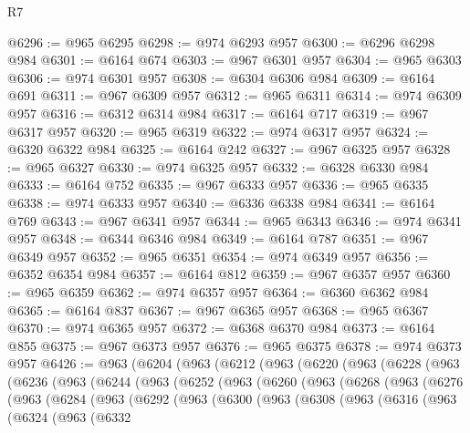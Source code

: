 \begin{lexlean}{R7}
\begin{coremodule}
@6296 := @965 @6295
@6298 := @974 @6293 @957
@6300 := @6296 @6298 @984
@6301 := @6164 @674
@6303 := @967 @6301 @957
@6304 := @965 @6303
@6306 := @974 @6301 @957
@6308 := @6304 @6306 @984
@6309 := @6164 @691
@6311 := @967 @6309 @957
@6312 := @965 @6311
@6314 := @974 @6309 @957
@6316 := @6312 @6314 @984
@6317 := @6164 @717
@6319 := @967 @6317 @957
@6320 := @965 @6319
@6322 := @974 @6317 @957
@6324 := @6320 @6322 @984
@6325 := @6164 @242
@6327 := @967 @6325 @957
@6328 := @965 @6327
@6330 := @974 @6325 @957
@6332 := @6328 @6330 @984
@6333 := @6164 @752
@6335 := @967 @6333 @957
@6336 := @965 @6335
@6338 := @974 @6333 @957
@6340 := @6336 @6338 @984
@6341 := @6164 @769
@6343 := @967 @6341 @957
@6344 := @965 @6343
@6346 := @974 @6341 @957
@6348 := @6344 @6346 @984
@6349 := @6164 @787
@6351 := @967 @6349 @957
@6352 := @965 @6351
@6354 := @974 @6349 @957
@6356 := @6352 @6354 @984
@6357 := @6164 @812
@6359 := @967 @6357 @957
@6360 := @965 @6359
@6362 := @974 @6357 @957
@6364 := @6360 @6362 @984
@6365 := @6164 @837
@6367 := @967 @6365 @957
@6368 := @965 @6367
@6370 := @974 @6365 @957
@6372 := @6368 @6370 @984
@6373 := @6164 @855
@6375 := @967 @6373 @957
@6376 := @965 @6375
@6378 := @974 @6373 @957
@6426 := @963
    (@6204
      (@963
        (@6212
          (@963
            (@6220
              (@963
                (@6228
                  (@963
                    (@6236
                      (@963
                        (@6244
                          (@963
                            (@6252
                              (@963
                                (@6260
                                  (@963
                                    (@6268
                                      (@963
                                        (@6276
                                          (@963
                                            (@6284
                                              (@963
                                                (@6292
                                                  (@963
                                                    (@6300
                                                      (@963
                                                        (@6308
                                                          (@963
                                                            (@6316
                                                              (@963
                                                                (@6324
                                                                  (@963
                                                                    (@6332

\end{coremodule}
\end{lexlean}
